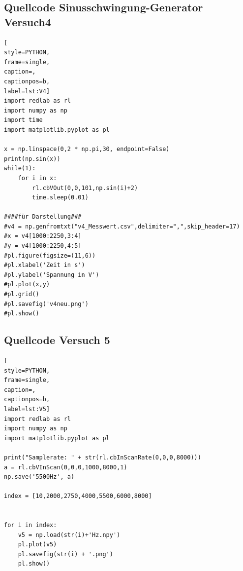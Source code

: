 \documentclass[12pt, oneside, a4paper, \docLanguage]{report}
\begin{document}
\subsection{Quellcode Sinusschwingung-Generator Versuch4}
\label{chap:APPENDIX_SOURCECODE_V1}
\begin{lstlisting}[
style=PYTHON,
frame=single,
caption=,
captionpos=b,
label=lst:V4]
import redlab as rl
import numpy as np
import time
import matplotlib.pyplot as pl

x = np.linspace(0,2 * np.pi,30, endpoint=False)
print(np.sin(x))
while(1):
    for i in x:
        rl.cbVOut(0,0,101,np.sin(i)+2)
        time.sleep(0.01)
        
####für Darstellung###
#v4 = np.genfromtxt("v4_Messwert.csv",delimiter=",",skip_header=17)
#x = v4[1000:2250,3:4]
#y = v4[1000:2250,4:5]
#pl.figure(figsize=(11,6))
#pl.xlabel('Zeit in s')
#pl.ylabel('Spannung in V')
#pl.plot(x,y)
#pl.grid()
#pl.savefig('v4neu.png')
#pl.show()
\end{lstlisting}

\subsection{Quellcode Versuch 5}
\label{chap:APPENDIX_SOURCECODE_V2}
\begin{lstlisting}[
style=PYTHON,
frame=single,
caption=,
captionpos=b,
label=lst:V5]
import redlab as rl
import numpy as np
import matplotlib.pyplot as pl

print("Samplerate: " + str(rl.cbInScanRate(0,0,0,8000)))
a = rl.cbVInScan(0,0,0,1000,8000,1)
np.save('5500Hz', a)

index = [10,2000,2750,4000,5500,6000,8000]


for i in index:
    v5 = np.load(str(i)+'Hz.npy')
    pl.plot(v5)
    pl.savefig(str(i) + '.png')
    pl.show()
    
\end{lstlisting}
\end{document}
